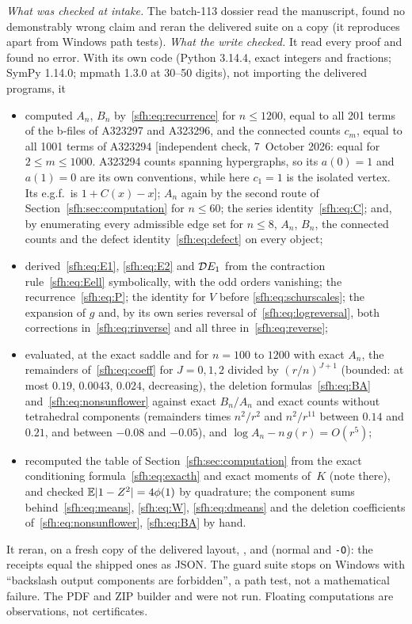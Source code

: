 \begin{writenote}
\emph{What was checked at intake.} The batch-113 dossier read the manuscript,
found no demonstrably wrong claim and reran the delivered suite on a copy (it
reproduces apart from Windows path tests). \emph{What the write checked.} It
read every proof and found no error. With its own code (Python 3.14.4, exact
integers and fractions; SymPy 1.14.0; mpmath 1.3.0 at 30--50 digits), not
importing the delivered programs, it
\begin{itemize}\raggedright
\item computed $A_n$, $B_n$ by~\eqref{sfh:eq:recurrence} for $n\le1200$, equal
to all 201 terms of the b-files of A323297 and A323296, and the connected
counts $c_m$, equal to all 1001 terms of A323294 [independent check,
7~October 2026: equal for $2\le m\le1000$. A323294 counts spanning
hypergraphs, so its $a(0)=1$ and $a(1)=0$ are its own conventions, while here
$c_1=1$ is the isolated vertex. Its e.g.f.\ is $1+C(x)-x$]; $A_n$ again by the second
route of Section~\ref{sfh:sec:computation} for $n\le60$; the series
identity~\eqref{sfh:eq:C}; and, by enumerating every admissible edge set for
$n\le8$, $A_n$, $B_n$, the connected counts and the defect
identity~\eqref{sfh:eq:defect} on every object;
\item derived~\eqref{sfh:eq:E1}, \eqref{sfh:eq:E2} and $\mathcal D E_1$ from the
contraction rule~\eqref{sfh:eq:Eell} symbolically, with the odd orders
vanishing; the recurrence~\eqref{sfh:eq:P}; the identity for $V$ before
\eqref{sfh:eq:schurscales}; the expansion of $g$ and, by its own series
reversal of~\eqref{sfh:eq:logreversal}, both corrections
in~\eqref{sfh:eq:rinverse} and all three in~\eqref{sfh:eq:reverse};
\item evaluated, at the exact saddle and for $n=100$ to $1200$ with exact
$A_n$, the remainders of~\eqref{sfh:eq:coeff} for $J=0,1,2$ divided by
$(r/n)^{J+1}$ (bounded: at most $0.19$, $0.0043$, $0.024$, decreasing), the
deletion formulas~\eqref{sfh:eq:BA} and~\eqref{sfh:eq:nonsunflower} against
exact $B_n/A_n$ and exact counts without tetrahedral components (remainders
times $n^2/r^2$ and $n^2/r^{11}$ between $0.14$ and $0.21$, and between
$-0.08$ and $-0.05$), and $\log A_n-n\,g(r)=O(r^5)$;
\item recomputed the table of Section~\ref{sfh:sec:computation} from the exact
conditioning formula~\eqref{sfh:eq:exacth} and exact moments of~$K$ (note
there), and checked $\mathbb E|1-Z^2|=4\phi(1)$ by quadrature; the component sums
behind~\eqref{sfh:eq:means}, \eqref{sfh:eq:W}, \eqref{sfh:eq:dmeans} and the
deletion coefficients of~\eqref{sfh:eq:nonsunflower}, \eqref{sfh:eq:BA} by
hand.
\end{itemize}
It reran, on a fresh copy of the delivered layout, ,
 and  (normal and
\texttt{-O}): the receipts equal the shipped ones as JSON. The guard suite
stops on Windows with ``backslash output components are forbidden'', a path
test, not a mathematical failure. The PDF and ZIP builder and
 were not run. Floating computations are observations,
not certificates.


\end{writenote}
